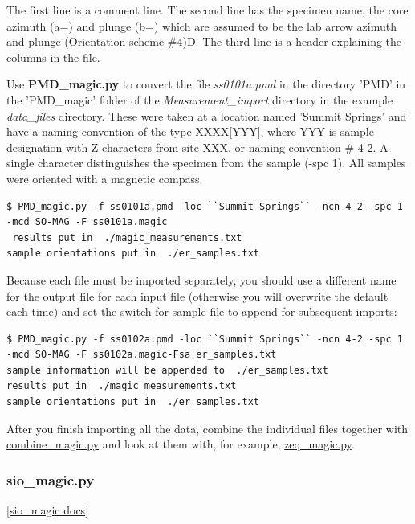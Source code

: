 \documentclass[11pt]{book}
\begin{document}
{{The first line is a comment line.  The second line has the specimen name, the core azimuth (a=) and plunge (b=) which are assumed to be the lab arrow azimuth and plunge (\href{#orientation_schemes}{Orientation scheme} \#4)D.   The third line is a header explaining the columns in the file.


Use {\bf PMD\_magic.py} to convert the file {\it ss0101a.pmd} in the directory 'PMD' in the 'PMD\_magic' folder of the {\it Measurement\_import} directory in the example {\it data\_files } directory.  These were taken at a location named 'Summit Springs' and have a naming convention of the type XXXX[YYY], where  YYY is sample designation with Z characters from site XXX, or naming convention \# 4-2.  A single character distinguishes the specimen from the sample (-spc 1).  All samples were oriented with a magnetic compass.

\begin{verbatim}
$ PMD_magic.py -f ss0101a.pmd -loc ``Summit Springs`` -ncn 4-2 -spc 1 -mcd SO-MAG -F ss0101a.magic
 results put in  ./magic_measurements.txt
sample orientations put in  ./er_samples.txt
\end{verbatim}

Because each file must be imported separately, you should use a different name for the output file for each input file (otherwise you will overwrite the default each time) and set the switch  for sample file to append for subsequent imports:

\begin{verbatim}
$ PMD_magic.py -f ss0102a.pmd -loc ``Summit Springs`` -ncn 4-2 -spc 1 -mcd SO-MAG -F ss0102a.magic-Fsa er_samples.txt
sample information will be appended to  ./er_samples.txt
results put in  ./magic_measurements.txt
sample orientations put in  ./er_samples.txt
\end{verbatim}
After you finish importing all the data, combine the individual files together with \href{#combine_magic.py}{combine\_magic.py} and look at them with, for example, \href{#zeq_magic.py}{zeq\_magic.py}.


\subsubsection {sio\_magic.py}
\href{https://github.com/PmagPy/PmagPy/blob/master/programs/sio_magic.py}{[sio\_magic docs]}


}}
\end{document}
